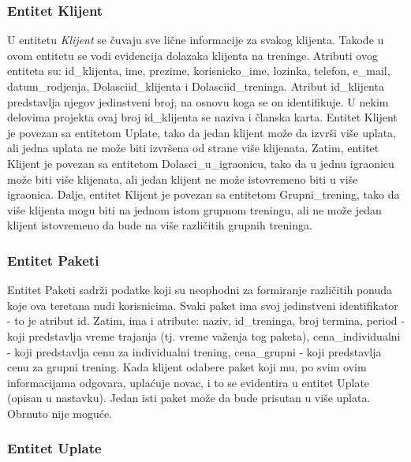 \documentclass[../main.tex]{subfiles}
\begin{document}
\subsubsection{Entitet Klijent}
U entitetu \textit{Klijent} se čuvaju sve lične informacije za svakog klijenta. Takođe u ovom entitetu se vodi evidencija dolazaka klijenta na treninge. Atributi ovog entiteta su: id\_klijenta, ime, prezime, korisnicko\_ime, lozinka, telefon, e\_mail, datum\_rodjenja, Dolasciid\_klijenta i  Dolasciid\_treninga.
Atribut id\_klijenta predstavlja njegov jedinstveni broj, na osnovu koga se on identifikuje. U nekim delovima projekta ovaj broj id\_klijenta se naziva i članska karta. Entitet Klijent je povezan sa entitetom Uplate, tako da jedan klijent može da izvrši više uplata, ali jedna uplata ne može biti izvršena od strane više klijenata. Zatim, entitet Klijent je povezan sa entitetom Dolasci\_u\_igraonicu, tako da u jednu igraonicu može biti više klijenata, ali jedan klijent ne može istovremeno biti u više igraonica. Dalje, entitet Klijent je povezan sa entitetom Grupni\_trening, tako da više klijenta mogu biti na jednom istom grupnom treningu, ali ne može jedan klijent istovremeno da bude na više različitih grupnih treninga.


\subsubsection{Entitet Paketi}
Entitet Paketi sadrži podatke koji su neophodni za formiranje različitih ponuda koje ova teretana nudi korisnicima. Svaki paket ima svoj jedinstveni identifikator - to je atribut id. Zatim, ima i atribute: naziv, id\_treninga, broj termina, period - koji predstavlja vreme trajanja (tj. vreme važenja tog paketa), cena\_individualni - koji predstavlja cenu za individualni trening, cena\_grupni - koji predstavlja cenu za grupni trening. Kada klijent odabere paket koji mu, po svim ovim informacijama odgovara, uplaćuje novac, i to se evidentira u entitet Uplate (opisan u nastavku). Jedan isti paket može da bude prisutan u više uplata. Obrnuto nije moguće.


\subsubsection{Entitet Uplate}
\end{document}
